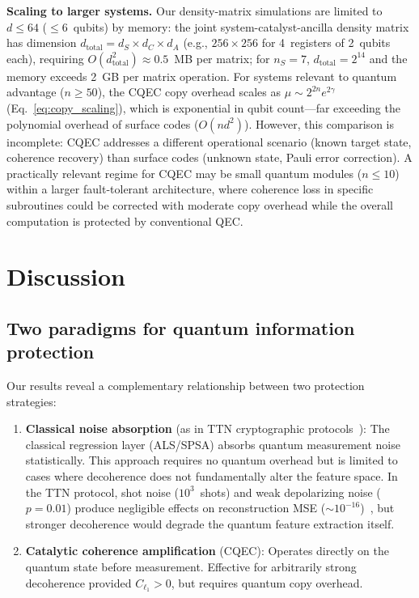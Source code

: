 \documentclass[prx,twocolumn,superscriptaddress,longbibliography,floatfix]{revtex4-2}
\begin{document}
\textbf{Scaling to larger systems.}
Our density-matrix simulations are limited to $d \leq 64$ ($\leq 6$~qubits) by memory: the joint system-catalyst-ancilla density matrix has dimension $d_\mathrm{total} = d_S \times d_C \times d_A$ (e.g., $256 \times 256$ for 4~registers of 2~qubits each), requiring $O(d_\mathrm{total}^2) \approx 0.5$~MB per matrix; for $n_S = 7$, $d_\mathrm{total} = 2^{14}$ and the memory exceeds 2~GB per matrix operation.
For systems relevant to quantum advantage ($n \geq 50$), the CQEC copy overhead scales as $\mu \sim 2^{2n} e^{2\gamma}$ (Eq.~\eqref{eq:copy_scaling}), which is exponential in qubit count---far exceeding the polynomial overhead of surface codes ($O(n d^2)$).
However, this comparison is incomplete: CQEC addresses a different operational scenario (known target state, coherence recovery) than surface codes (unknown state, Pauli error correction).
A practically relevant regime for CQEC may be small quantum modules ($n \leq 10$) within a larger fault-tolerant architecture, where coherence loss in specific subroutines could be corrected with moderate copy overhead while the overall computation is protected by conventional QEC.


\section{Discussion}
\label{sec:discussion}

\subsection{Two paradigms for quantum information protection}
\label{sec:paradigms}

Our results reveal a complementary relationship between two protection strategies:
\begin{enumerate}
\item \textbf{Classical noise absorption} (as in TTN cryptographic protocols~\cite{Sim2019}):
The classical regression layer (ALS/SPSA) absorbs quantum measurement noise statistically.
This approach requires no quantum overhead but is limited to cases where decoherence does not fundamentally alter the feature space.
In the TTN protocol, shot noise ($10^3$~shots) and weak depolarizing noise ($p = 0.01$) produce negligible effects on reconstruction MSE ($\sim 10^{-16}$)~\cite{Sim2019}, but stronger decoherence would degrade the quantum feature extraction itself.

\item \textbf{Catalytic coherence amplification} (CQEC):
Operates directly on the quantum state before measurement.
Effective for arbitrarily strong decoherence provided $C_{\ell_1} > 0$, but requires quantum copy overhead.
\end{enumerate}
\end{document}
